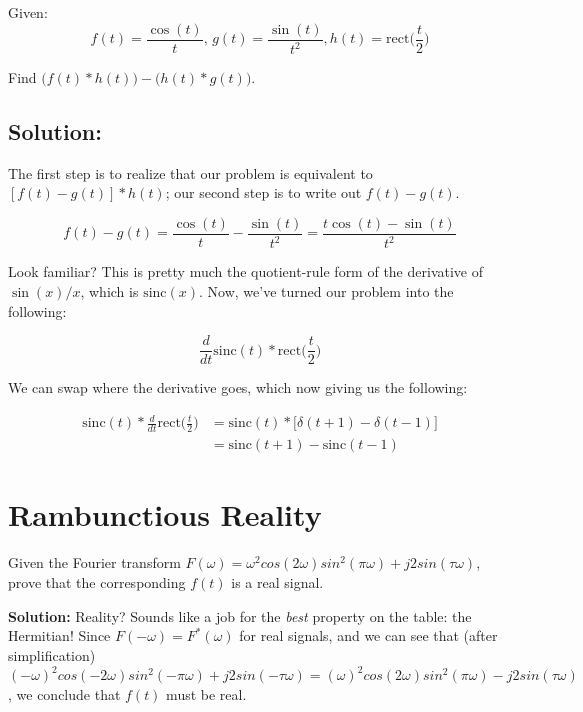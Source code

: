 \documentclass{article}
\begin{document}
Given:
$$f(t) = \frac{\cos(t)}{t},\, g(t) = \frac{\sin(t)}{t^2}, h(t) = \text{rect}\bigg(\frac{t}{2}\bigg)$$

Find $\big(f(t)*h(t)\big) - \big(h(t)*g(t)\big)$.

\subsection{Solution:}

The first step is to realize that our problem is equivalent to $[f(t) - g(t)] \ast h(t)$; our second step is to write out $f(t) - g(t)$.

\[
f(t)-g(t) = \frac{\cos(t)}{t} - \frac{\sin(t)}{t^2} = \frac{t\cos(t)-\sin(t)}{t^2}
\]

Look familiar? This is pretty much the quotient-rule form of the derivative of $\sin(x)/x$, which is $\text{sinc}(x)$. Now, we've turned our problem into the following:

\[
\frac{d}{dt}\text{sinc}(t)\ast \text{rect}\bigg(\frac{t}{2}\bigg)
\]

We can swap where the derivative goes, which now giving us the following:

\begin{equation*}
\begin{split}
\text{sinc}(t)\ast \frac{d}{dt}\text{rect}\bigg(\frac{t}{2}\bigg) &= \text{sinc}(t) \ast \big[\delta(t+1) - \delta(t-1)\big]\\
&= \boxed{\text{sinc}(t+1) - \text{sinc}(t-1)}
\end{split}
\end{equation*}

\newpage
\section{Rambunctious Reality}

Given the Fourier transform $F(\omega) = \omega^2cos(2\omega)sin^2(\pi\omega) + j2sin(\tau\omega)$, prove that the corresponding $f(t)$ is a real signal.

\textbf{Solution: }Reality? Sounds like a job for the \textit{best} property on the table: the Hermitian! Since $F(-\omega) = F^*(\omega)$ for real signals, and we can see that (after simplification) $(-\omega)^2cos(-2\omega)sin^2(-\pi\omega) + j2sin(-\tau\omega) = (\omega)^2cos(2\omega)sin^2(\pi\omega) - j2sin(\tau\omega)$, we conclude that $f(t)$ must be real.
 
\vspace{3cm}
\end{document}
